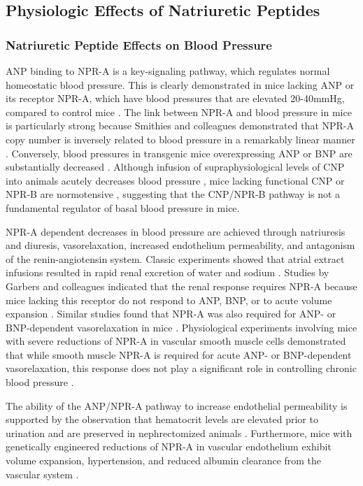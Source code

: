 \documentclass[14pt,a4paper,onecolumn]{extarticle}
\begin{document}
\subsection{Physiologic Effects of Natriuretic Peptides}


\subsubsection{Natriuretic Peptide Effects on Blood Pressure}
ANP binding to NPR-A is a key-signaling pathway, which regulates normal homeostatic blood pressure. This is clearly demonstrated in mice lacking ANP or its receptor NPR-A, which have blood pressures that are elevated 20-40mmHg, compared to control mice \citep{John1995} \citep{John1996} \citep{Lopez1995} \citep{Oliver1997}.
The link between NPR-A and blood pressure in mice is particularly strong because Smithies and colleagues demonstrated that NPR-A copy number is inversely related to blood pressure in a  remarkably linear manner \citep{Oliver1998}.
Conversely, blood pressures in transgenic mice overexpressing ANP or BNP are substantially decreased \citep{Ogawa1994a} \citep{Steinhelper1990}. Although infusion of supraphysiological levels of CNP into animals acutely decreases blood pressure \citep{Clavell1993} \citep{Sudoh1990}, mice lacking functional CNP or NPR-B are normotensive \citep{Chusho2001} \citep{Tamura2004}, suggesting that the CNP/NPR-B pathway is not a fundamental regulator of basal blood pressure in mice.

NPR-A dependent decreases in blood pressure are achieved through natriuresis and diuresis, vasorelaxation, increased endothelium permeability, and antagonism of the renin-angiotensin system. Classic experiments showed that atrial extract infusions resulted in rapid renal excretion of water and sodium \citep{deBold1981}. Studies by Garbers and colleagues indicated that the renal response requires NPR-A because mice lacking this receptor do not respond to ANP, BNP, or to acute volume expansion \citep{Kishimoto1996}. Similar studies found that NPR-A was also required for ANP- or BNP-dependent vasorelaxation in mice \citep{Lopez1997}. Physiological experiments involving mice with severe reductions of NPR-A in vascular smooth muscle cells demonstrated that while smooth muscle NPR-A is required for acute ANP- or BNP-dependent vasorelaxation, this response does not play a significant role in controlling chronic blood pressure \citep{Holtwick2002}.

The ability of the ANP/NPR-A pathway to increase  endothelial permeability is supported by the observation that hematocrit levels are elevated prior to urination and are preserved in nephrectomized animals \citep{Almeida1986} \citep{Fluckiger1986} \citep{Richards1988}.
 Furthermore, mice with genetically engineered reductions of NPR-A in vascular endothelium exhibit volume expansion, hypertension, and reduced albumin clearance from the vascular system \citep{Sabrane2005}.
\end{document}
